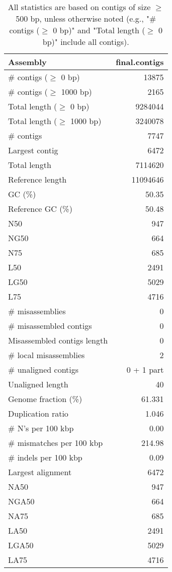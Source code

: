\documentclass[12pt,a4paper]{article}
\begin{document}
\begin{table}[ht]
\begin{center}
\caption{All statistics are based on contigs of size $\geq$ 500 bp, unless otherwise noted (e.g., "\# contigs ($\geq$ 0 bp)" and "Total length ($\geq$ 0 bp)" include all contigs).}
\begin{tabular}{|l*{1}{|r}|}
\hline
Assembly & final.contigs \\ \hline
\# contigs ($\geq$ 0 bp) & 13875 \\ \hline
\# contigs ($\geq$ 1000 bp) & 2165 \\ \hline
Total length ($\geq$ 0 bp) & 9284044 \\ \hline
Total length ($\geq$ 1000 bp) & 3240078 \\ \hline
\# contigs & 7747 \\ \hline
Largest contig & 6472 \\ \hline
Total length & 7114620 \\ \hline
Reference length & 11094646 \\ \hline
GC (\%) & 50.35 \\ \hline
Reference GC (\%) & 50.48 \\ \hline
N50 & 947 \\ \hline
NG50 & 664 \\ \hline
N75 & 685 \\ \hline
L50 & 2491 \\ \hline
LG50 & 5029 \\ \hline
L75 & 4716 \\ \hline
\# misassemblies & 0 \\ \hline
\# misassembled contigs & 0 \\ \hline
Misassembled contigs length & 0 \\ \hline
\# local misassemblies & 2 \\ \hline
\# unaligned contigs & 0 + 1 part \\ \hline
Unaligned length & 40 \\ \hline
Genome fraction (\%) & 61.331 \\ \hline
Duplication ratio & 1.046 \\ \hline
\# N's per 100 kbp & 0.00 \\ \hline
\# mismatches per 100 kbp & 214.98 \\ \hline
\# indels per 100 kbp & 0.09 \\ \hline
Largest alignment & 6472 \\ \hline
NA50 & 947 \\ \hline
NGA50 & 664 \\ \hline
NA75 & 685 \\ \hline
LA50 & 2491 \\ \hline
LGA50 & 5029 \\ \hline
LA75 & 4716 \\ \hline
\end{tabular}
\end{center}
\end{table}
\end{document}
